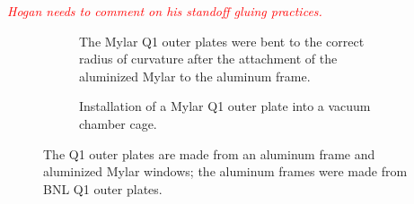 \medskip
\textcolor{red}{\textit{Hogan needs to comment on his standoff gluing practices.}}

\begin{figure}[]
	\centering
	\begin{subfigure}{\columnwidth}
		\caption{The Mylar Q1 outer plates were bent to the correct radius of curvature after the attachment of the aluminized Mylar to the aluminum frame.}\label{fig:bending_q1o_plate}
	\end{subfigure}
	\begin{subfigure}{\columnwidth}
		\caption{Installation of a Mylar Q1 outer plate into a vacuum chamber cage.}\label{fig:install_q1o_plate}
	\end{subfigure}
	\caption{The Q1 outer plates are made from an aluminum frame and aluminized Mylar windows; the aluminum frames were made from BNL Q1 outer plates.}\label{fig:q1o_plate}
\end{figure}

